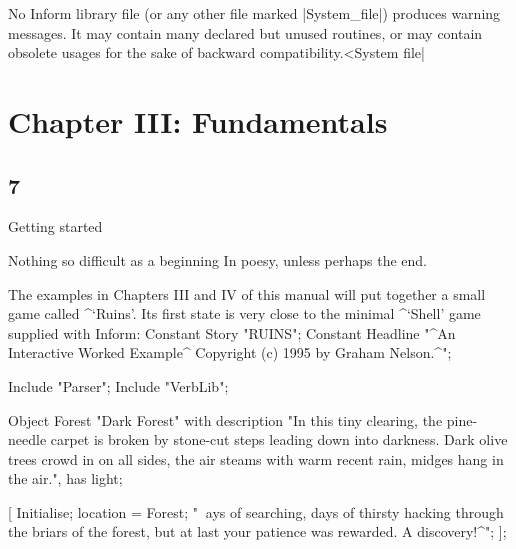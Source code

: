 \ddanger No Inform library file (or any other file marked |System_file|)
produces warning messages.  It may contain many declared but unused routines,
or may contain obsolete usages for the sake of backward
compatibility.^^|System file|

\tenpoint

\chapter{Chapter III: Fundamentals}

\section{7}{Getting started}

\poem
Nothing so difficult as a beginning
In poesy, unless perhaps the end.

\noindent
The examples in Chapters III and IV of this manual will put together
a small game called ^{`Ruins'}.  Its first state is very close to
the minimal ^{`Shell'} game supplied with Inform:
\beginstt
Constant Story "RUINS";
Constant Headline "^An Interactive Worked Example^
             Copyright (c) 1995 by Graham Nelson.^";

Include "Parser";
Include "VerbLib";

Object Forest "Dark Forest"
  with description
          "In this tiny clearing, the pine-needle carpet is broken by
           stone-cut steps leading down into darkness.  Dark olive
           trees crowd in on all sides, the air steams with warm recent
           rain, midges hang in the air.",
  has  light;

[ Initialise;
  location = Forest;
 "^^^^^Days of searching, days of thirsty hacking through the briars of
  the forest, but at last your patience was rewarded. A discovery!^";
];


